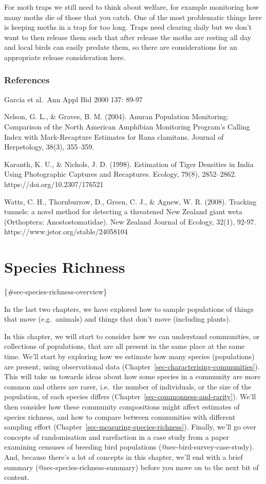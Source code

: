 \documentclass[
  letterpaper,
  DIV=11,
  numbers=noendperiod]{scrreprt}
\begin{document}
For moth traps we still need to think about welfare, for example
monitoring how many moths die of those that you catch. One of the most
problematic things here is keeping moths in a trap for too long. Traps
need clearing daily but we don't want to then release them such that
after release the moths are resting all day and local birds can easily
predate them, so there are considerations for an appropriate release
consideration here.

\section{References}\label{references-1}

Garcia et al.~Ann Appl Bid 2000 137: 89-97

Nelson, G. L., \& Graves, B. M. (2004). Anuran Population Monitoring:
Comparison of the North American Amphibian Monitoring Program's Calling
Index with Mark-Recapture Estimates for Rana clamitans. Journal of
Herpetology, 38(3), 355--359.

Karanth, K. U., \& Nichols, J. D. (1998). Estimation of Tiger Densities
in India Using Photographic Captures and Recaptures. Ecology, 79(8),
2852--2862. https://doi.org/10.2307/176521

Watts, C. H., Thornburrow, D., Green, C. J., \& Agnew, W. R. (2008).
Tracking tunnels: a novel method for detecting a threatened New Zealand
giant weta (Orthoptera: Anostostomatidae). New Zealand Journal of
Ecology, 32(1), 92-97. https://www.jstor.org/stable/24058104

\part{Species Richness}

\{\#sec-species-richness-overview\}

In the last two chapters, we have explored how to sample populations of
things that move (e.g.~animals) and things that don't move (including
plants).

In this chapter, we will start to consider how we can understand
communities, or collections of populations, that are all present in the
same place at the same time. We'll start by exploring how we estimate
how many species (populations) are present, using observational data
(Chapter~\ref{sec-characterising-communities}). This will take us
towards ideas about how some species in a community are more common and
others are rarer, i.e.~the number of individuals, or the size of the
population, of each species differs
(Chapter~\ref{sec-commonness-and-rarity}). We'll then consider how these
community compositions might affect estimates of species richness, and
how to compare between communities with different sampling effort
(Chapter~\ref{sec-measuring-species-richness}). Finally, we'll go over
concepts of randomisation and rarefaction in a case study from a paper
examining censuses of breeding bird populations
(@sec-bird-survey-case-study). And, because there's a lot of concepts in
this chapter, we'll end with a brief summary
(@sec-species-richness-summary) before you move on to the next bit of
content.
\end{document}
